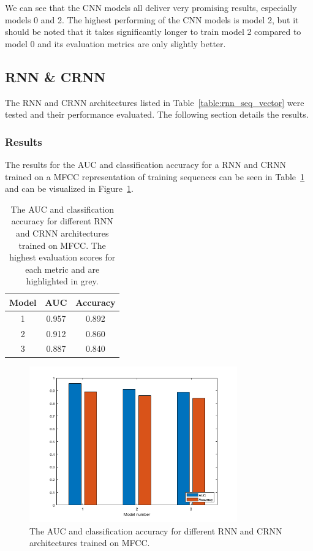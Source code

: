 We can see that the CNN models all deliver very promising results, especially
models 0 and 2. The highest performing of the CNN models is model 2, but it
should be noted that it takes significantly longer to train model 2 compared to
model 0 and its evaluation metrics are only slightly better.

\subsection{RNN \& CRNN}

The RNN and CRNN architectures listed in Table~\ref{table:rnn_seq_vector} were
tested and their performance evaluated. The following section details the
results.

\subsubsection{Results}

The results for the AUC and classification accuracy for a RNN and CRNN trained
on a MFCC representation of training sequences can be seen in
Table~\ref{table:rnn_mfcc_results} and can be visualized in
Figure~\ref{fig:rnn_mfcc_results}.

\begin{table}[ht]
\begin{center}
\begin{tabular}{c c c}
\toprule
Model & AUC & Accuracy \\ [0.5ex]
\midrule
1 & \cellcolor{lightgray} 0.957 & \cellcolor{lightgray} 0.892 \\
2 & 0.912 & 0.860 \\
3 & 0.887 & 0.840 \\
\bottomrule
\end{tabular}
\caption{The AUC and classification accuracy for different RNN and CRNN
architectures trained on MFCC\@. The highest evaluation scores for each metric
and are highlighted in grey.}\label{table:rnn_mfcc_results}
\end{center}
\end{table}

\begin{figure}[ht]
  \centering
  \includegraphics[width=0.8\textwidth]{figures/hyp2_rnn_mfcc_results.png}
  \caption{The AUC and classification accuracy for different RNN and CRNN architectures
  trained on MFCC.}\label{fig:rnn_mfcc_results}
\end{figure}

